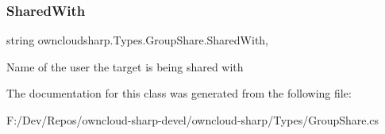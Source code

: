 \subsubsection{\texorpdfstring{Shared\+With}{SharedWith}}
{\footnotesize\ttfamily string owncloudsharp.\+Types.\+Group\+Share.\+Shared\+With\hspace{0.3cm}{\ttfamily [get]}, {\ttfamily [set]}}



Name of the user the target is being shared with 



The documentation for this class was generated from the following file\+:\begin{DoxyCompactItemize}
\item 
F\+:/\+Dev/\+Repos/owncloud-\/sharp-\/devel/owncloud-\/sharp/\+Types/Group\+Share.\+cs\end{DoxyCompactItemize}
